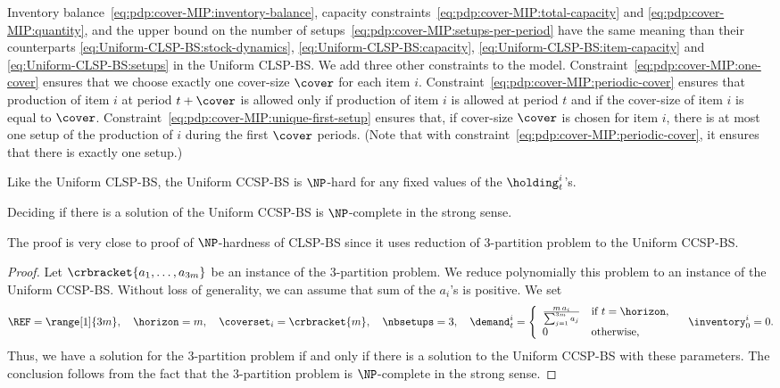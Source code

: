 Inventory balance~\eqref{eq:pdp:cover-MIP:inventory-balance}, capacity constraints~\eqref{eq:pdp:cover-MIP:total-capacity} and \eqref{eq:pdp:cover-MIP:quantity}, and the upper bound on the number of setups~\eqref{eq:pdp:cover-MIP:setups-per-period} have the same meaning than their counterparts \eqref{eq:Uniform-CLSP-BS:stock-dynamics}, \eqref{eq:Uniform-CLSP-BS:capacity}, \eqref{eq:Uniform-CLSP-BS:item-capacity} and \eqref{eq:Uniform-CLSP-BS:setups} in the Uniform CLSP-BS.
We add three other constraints to the model.
Constraint~\eqref{eq:pdp:cover-MIP:one-cover} ensures that we choose exactly one cover-size $\cover$ for each item $i$.
Constraint~\eqref{eq:pdp:cover-MIP:periodic-cover} ensures that production of item $i$ at period $t+\cover$ is allowed only if production of item $i$ is allowed at period $t$ and if the cover-size of item $i$ is equal to $\cover$.
Constraint~\eqref{eq:pdp:cover-MIP:unique-first-setup} ensures that, if cover-size $\cover$ is chosen for item $i$, there is at most one setup of the production of $i$ during the first $\cover$ periods.
(Note that with constraint~\eqref{eq:pdp:cover-MIP:periodic-cover}, it ensures that there is exactly one setup.)


\medskip


Like the Uniform CLSP-BS, the Uniform CCSP-BS is $\NP$-hard for any fixed values of the $\holding_t^i$'s.


\begin{thm}
  Deciding if there is a solution of the Uniform CCSP-BS is $\NP$-complete in the strong sense.
\end{thm}


The proof is very close to proof of $\NP$-hardness of CLSP-BS since it uses reduction of 3-partition problem to the Uniform CCSP-BS.


\begin{proof}
Let $\crbracket{a_1,\ldots,a_{3m}}$ be an instance of the 3-partition problem.
We reduce polynomially this problem to an instance of the Uniform CCSP-BS.
Without loss of generality, we can assume that sum of the $a_i$'s is positive.
We set
\begin{equation}
  \REF=\range[1]{3m}
  ,\quad
  \horizon=m
  ,\quad
  \coverset_i=\crbracket{m}
  ,\quad
  \nbsetups=3
  ,\quad
  \demand_t^i
  =\left\{
  \begin{array}{ll}
  \frac{m\,a_i}{\sum_{j=1}^{3m}a_j} & \mbox{if}\ t=\horizon,
  \\
  0 & \mbox{otherwise,}\end{array}
  \right.
  \quad
  \inventory_0^i=0.
\end{equation}
Thus, we have a solution for the 3-partition problem if and only if there is a solution to the Uniform CCSP-BS with these parameters. The conclusion follows from the fact that the 3-partition problem is $\NP$-complete in the strong sense.
\end{proof}


